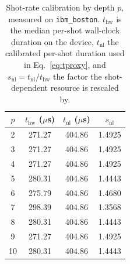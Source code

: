 \begin{table}[t]
    \centering
    \caption{Shot-rate calibration by depth $p$, measured on \texttt{ibm\_boston}.
    $t_{\text{hw}}$ is the median per-shot wall-clock duration on the device,
    $t_{\text{nl}}$ the calibrated per-shot duration used in
    Eq.~\eqref{eq:tproxy}, and $s_{\text{nl}} = t_{\text{nl}}/t_{\text{hw}}$
    the factor the shot-dependent resource is rescaled by.}
    \label{tab:calibration}
    \begin{tabular}{cccc}
        \hline
        $p$ & $t_{\text{hw}}$ ($\mu$s) & $t_{\text{nl}}$ ($\mu$s) & $s_{\text{nl}}$ \\
        \hline
        2  & 271.27 & 404.86 & 1.4925 \\
        3  & 271.27 & 404.86 & 1.4925 \\
        4  & 271.27 & 404.86 & 1.4925 \\
        5  & 280.31 & 404.86 & 1.4443 \\
        6  & 275.79 & 404.86 & 1.4680 \\
        7  & 298.39 & 404.86 & 1.3568 \\
        8  & 280.31 & 404.86 & 1.4443 \\
        9  & 271.27 & 404.86 & 1.4925 \\
        10 & 280.31 & 404.86 & 1.4443 \\
        \hline
    \end{tabular}
\end{table}

